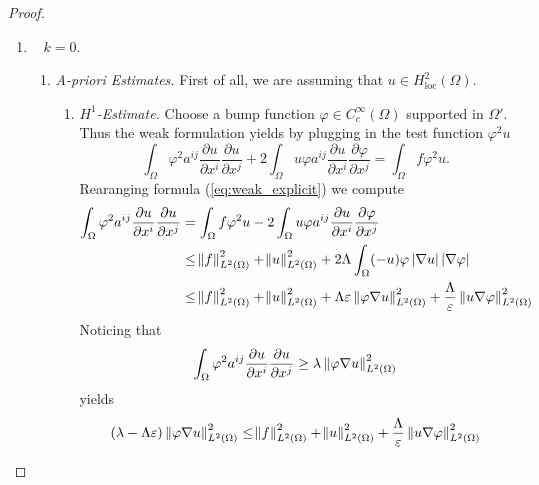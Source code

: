 \begin{proof}
	\begin{enumerate}[label = \emph{Step \arabic*:}, wide = 0pt]
		\item
			~
			$k = 0$. 
			\begin{enumerate}[label = \textup{(}\alph*\textup{)},wide = 0pt]
				\item \emph{A-priori Estimates.} First of all, we are assuming that $u \in H^2_{\text{loc}}(\Omega)$. 
				\begin{enumerate}[label = \textup{(}\roman*\textup{)}]
					\item \emph{$H^1$-Estimate.} Choose a bump function $\varphi \in C^\infty_c(\Omega)$ supported in $\Omega'$. Thus the weak formulation yields by plugging in the test function $\varphi^2 u$
						\begin{equation}
							\label{eq:weak_explicit}
							\int_\Omega \varphi^2 a^{ij}\frac{\partial u}{\partial x^i}\frac{\partial u}{\partial x^j} + 2\int_{\Omega} u\varphi a^{ij}\frac{\partial u}{\partial x^i}\frac{\partial \varphi}{\partial x^j} = \int_\Omega f \varphi^2 u.
						\end{equation}
						Rearanging formula (\ref{eq:weak_explicit}) we compute
						\begin{align*}
							\int_\Omega \varphi^2 a^{ij}\frac{\partial u}{\partial x^i}\frac{\partial u}{\partial x^j} &= \int_\Omega f \varphi^2 u -  2\int_{\Omega} u\varphi a^{ij}\frac{\partial u}{\partial x^i}\frac{\partial \varphi}{\partial x^j}\\
							&\leq \norm{f}_{L^2(\Omega)}^2 + \norm{u}_{L^2(\Omega)}^2 + 2 \Lambda \int_\Omega (-u)\varphi \abs[0]{\nabla u}\abs[0]{\nabla \varphi}\\
							&\leq \norm{f}_{L^2(\Omega)}^2 + \norm{u}_{L^2(\Omega)}^2 + \Lambda \varepsilon \norm[0]{\varphi\nabla u}_{L^2(\Omega)}^2 + \frac{\Lambda}{\varepsilon}\norm[0]{u \nabla \varphi}_{L^2(\Omega)}^2
						\end{align*}
						Noticing that
						\begin{equation*}
							\int_\Omega \varphi^2 a^{ij}\frac{\partial u}{\partial x^i}\frac{\partial u}{\partial x^j} \geq \lambda \norm[0]{\varphi\nabla u}_{L^2(\Omega)}^2
						\end{equation*}
						\noindent yields
						\begin{equation*}
							(\lambda - \Lambda \varepsilon) \norm[0]{\varphi\nabla u}_{L^2(\Omega)}^2 \leq  \norm{f}_{L^2(\Omega)}^2 + \norm{u}_{L^2(\Omega)}^2 + \frac{\Lambda}{\varepsilon}\norm[0]{u \nabla \varphi}_{L^2(\Omega)}^2

\end{equation*}
\end{enumerate}
\end{enumerate}
\end{enumerate}
\end{proof}

